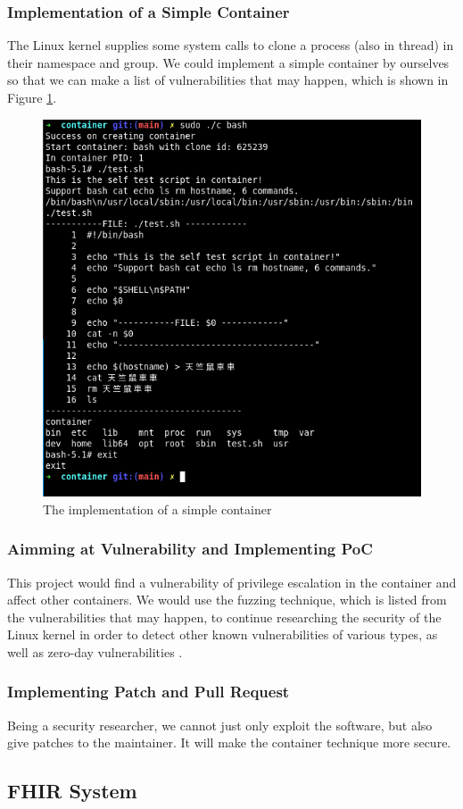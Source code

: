 \documentclass[12pt,a4paper]{article}
\begin{document}
\subsubsection{Implementation of a Simple Container}
The Linux kernel supplies some system calls to clone a process (also in thread) in their namespace
and group. We could implement a simple container by ourselves so that we can make a list of
vulnerabilities that may happen, which is shown in Figure \ref*{Fig:sc}.

\begin{figure}
  \includegraphics[width=.5\textwidth]{Screenshot from 2021-02-09 19-45-29.png}
  \caption{The implementation of a simple container}
  \label{Fig:sc}
\end{figure}

\subsubsection{Aimming at Vulnerability and Implementing PoC}
This project would find a vulnerability of privilege escalation in the container and affect
other containers. We would use the fuzzing technique, which is listed from the vulnerabilities
that may happen, to continue researching the security of the Linux kernel in order to detect
other known vulnerabilities of various types, as well as zero-day vulnerabilities \cite{Fuzzing}.

\subsubsection{Implementing Patch and Pull Request}
Being a security researcher, we cannot just only exploit the software, but also give patches to
the maintainer. It will make the container technique more secure.

\subsection{FHIR System}
\end{document}
